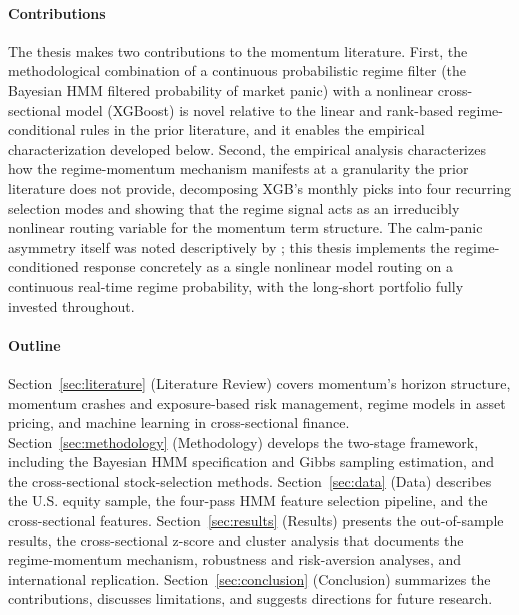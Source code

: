 \paragraph{Contributions} The thesis makes two contributions to the momentum literature. First, the methodological combination of a continuous probabilistic regime filter (the Bayesian HMM filtered probability of market panic) with a nonlinear cross-sectional model (XGBoost) is novel relative to the linear and rank-based regime-conditional rules in the prior literature, and it enables the empirical characterization developed below. Second, the empirical analysis characterizes how the regime-momentum mechanism manifests at a granularity the prior literature does not provide, decomposing XGB's monthly picks into four recurring selection modes and showing that the regime signal acts as an irreducibly nonlinear routing variable for the momentum term structure. The calm-panic asymmetry itself was noted descriptively by \citet{Cooper2004}; this thesis implements the regime-conditioned response concretely as a single nonlinear model routing on a continuous real-time regime probability, with the long-short portfolio fully invested throughout.

\paragraph{Outline} Section~\ref{sec:literature} (Literature Review) covers momentum's horizon structure, momentum crashes and exposure-based risk management, regime models in asset pricing, and machine learning in cross-sectional finance. Section~\ref{sec:methodology} (Methodology) develops the two-stage framework, including the Bayesian HMM specification and Gibbs sampling estimation, and the cross-sectional stock-selection methods. Section~\ref{sec:data} (Data) describes the U.S. equity sample, the four-pass HMM feature selection pipeline, and the cross-sectional features. Section~\ref{sec:results} (Results) presents the out-of-sample results, the cross-sectional z-score and cluster analysis that documents the regime-momentum mechanism, robustness and risk-aversion analyses, and international replication. Section~\ref{sec:conclusion} (Conclusion) summarizes the contributions, discusses limitations, and suggests directions for future research.
